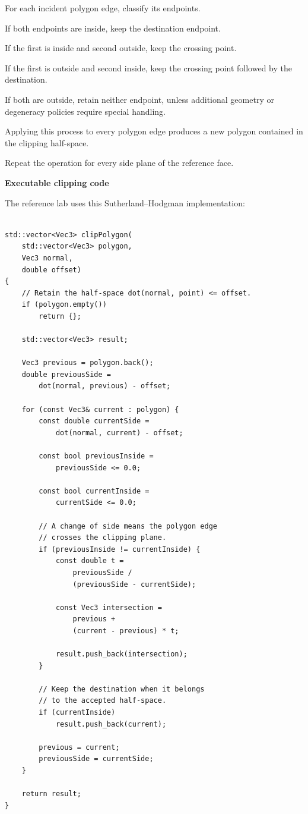 For each incident polygon edge, classify its endpoints.

If both endpoints are inside, keep the destination endpoint.

If the first is inside and second outside, keep the crossing point.

If the first is outside and second inside, keep the crossing point followed by the destination.

If both are outside, retain neither endpoint, unless additional geometry or degeneracy policies require special handling.

Applying this process to every polygon edge produces a new polygon contained in the clipping half-space.

Repeat the operation for every side plane of the reference face.

\textbf{Executable clipping code}

The reference lab uses this Sutherland--Hodgman implementation:

\begin{verbatim}

std::vector<Vec3> clipPolygon(
    std::vector<Vec3> polygon,
    Vec3 normal,
    double offset)
{
    // Retain the half-space dot(normal, point) <= offset.
    if (polygon.empty())
        return {};

    std::vector<Vec3> result;

    Vec3 previous = polygon.back();
    double previousSide =
        dot(normal, previous) - offset;

    for (const Vec3& current : polygon) {
        const double currentSide =
            dot(normal, current) - offset;

        const bool previousInside =
            previousSide <= 0.0;

        const bool currentInside =
            currentSide <= 0.0;

        // A change of side means the polygon edge
        // crosses the clipping plane.
        if (previousInside != currentInside) {
            const double t =
                previousSide /
                (previousSide - currentSide);

            const Vec3 intersection =
                previous +
                (current - previous) * t;

            result.push_back(intersection);
        }

        // Keep the destination when it belongs
        // to the accepted half-space.
        if (currentInside)
            result.push_back(current);

        previous = current;
        previousSide = currentSide;
    }

    return result;
}
\end{verbatim}

